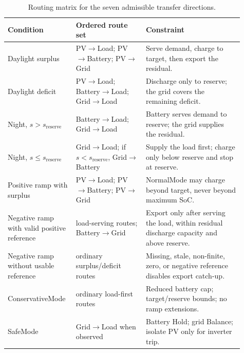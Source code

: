 \begin{table}[!tbp]
\centering
\footnotesize
\begin{tabular}{@{}M{0.23\linewidth}M{0.29\linewidth}M{0.39\linewidth}@{}}
\toprule
\textbf{Condition} & \textbf{Ordered route set} & \textbf{Constraint} \\
\midrule
Daylight surplus & PV$\to$Load; PV$\to$Battery; PV$\to$Grid & Serve demand, charge to target, then export the residual. \\
\rowsep%
Daylight deficit & PV$\to$Load; Battery$\to$Load; Grid$\to$Load & Discharge only to reserve; the grid covers the remaining deficit. \\
\rowsep%
Night, $s>s_{\mathrm{reserve}}$ & Battery$\to$Load; Grid$\to$Load & Battery serves demand to reserve; the grid supplies the residual. \\
\rowsep%
Night, $s\leq s_{\mathrm{reserve}}$ & Grid$\to$Load; if $s<s_{\mathrm{reserve}}$, Grid$\to$Battery & Supply the load first; charge only below reserve and stop at reserve. \\
\midrule
Positive ramp with surplus & PV$\to$Load; PV$\to$Battery; PV$\to$Grid & NormalMode may charge beyond target, never beyond maximum SoC. \\
\rowsep%
Negative ramp with valid positive reference & load-serving routes; Battery$\to$Grid & Export only after serving the load, within residual discharge capacity and above reserve. \\
\rowsep%
Negative ramp without usable reference & ordinary surplus/deficit routes & Missing, stale, non-finite, zero, or negative reference disables export catch-up. \\
\midrule
ConservativeMode & ordinary load-first routes & Reduced battery cap; target/reserve bounds; no ramp extensions. \\
\rowsep%
SafeMode & Grid$\to$Load when observed & Battery Hold; grid Balance; isolate PV only for inverter trip. \\
\bottomrule
\end{tabular}
\caption{Routing matrix for the seven admissible transfer directions.}%
\label{tab:routing}
\end{table}
